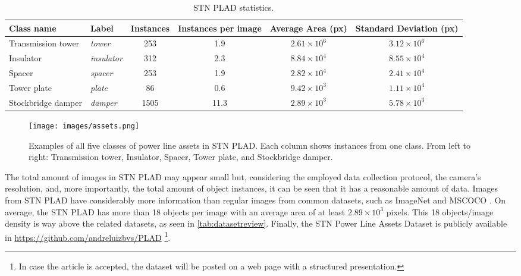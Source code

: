 \documentclass[10pt,conference]{IEEEtran}
\begin{document}
\begin{table*}[htbp]
 \caption{STN PLAD statistics.}
  \centering
\begin{tabular}{llcccc}
\toprule
Class name              & Label             & Instances & Instances per image & Average Area (px)         & Standard Deviation (px)        \\
\midrule
Transmission tower & \textit{tower}     & 253       & 1.9       & $2.61\times10^6$ & $3.12\times10^6$ \\
Insulator          & \textit{insulator} & 312       & 2.3       & $8.84\times10^4$ & $8.55\times10^4$ \\
Spacer             & \textit{spacer}    & 253       & 1.9       & $2.82\times10^4$ & $2.41\times10^4$ \\
Tower plate        & \textit{plate}     & 86        & 0.6       & $9.42\times10^3$ & $1.11\times10^4$ \\
Stockbridge damper & \textit{damper}    & 1505      & 11.3      & $2.89\times10^3$ & $5.78\times10^3$ \\
    \bottomrule
  \end{tabular}
  \label{tab:objsperclass}
\end{table*}




\begin{figure*}[htp]
\captionsetup{justification=centering}
\centering
\texttt{[image: images/assets.png]}
\caption{Examples of all five classes of power line assets in STN PLAD. Each column shows instances from one class. From left to right: Transmission tower, Insulator, Spacer, Tower plate, and Stockbridge damper.}
\label{fig:assets}
\end{figure*}

The total amount of images in STN PLAD may appear small but, considering the employed data collection protocol, the camera's resolution, and, more importantly, the total amount of object instances, it can be seen that it has a reasonable amount of data. Images from STN PLAD have considerably more information than regular images from common datasets, such as ImageNet \cite{krizhevsky2012imagenet} and MSCOCO \cite{lin2014microsoft}. On average, the STN PLAD has more than 18 objects per image with an average area of at least $2.89\times10^3$ pixels. This 18 objects/image density is way above the related datasets, as seen in \autoref{tab:datasetreview}. Finally, the STN Power Line Assets Dataset is publicly available in \url{https://github.com/andreluizbvs/PLAD} \footnote{In case the article is accepted, the dataset will be posted on a web page with a structured presentation.}.
\end{document}
